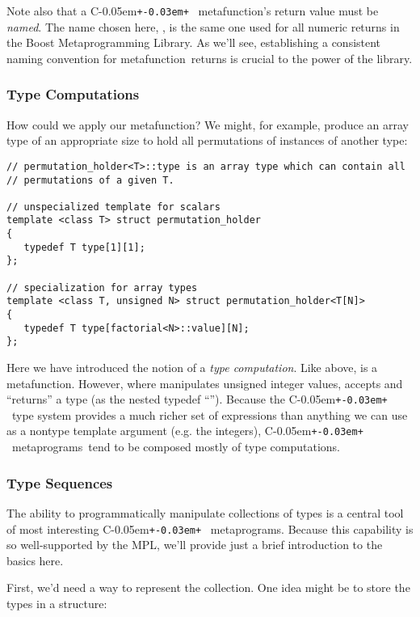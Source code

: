\documentclass{kapproc}
\newcommand{\Cpp}{C\kern-0.05em\texttt{+\kern-0.03em+}%
}
\newcommand{\Mpl}{Boost Meta\-pro\-gram\-ming Library}
\newcommand{\mpgms}{meta\-pro\-grams}
\newcommand{\mfn}{meta\-func\-tion}
\begin{document}
Note also that a \Cpp\ \mfn's return value must be \emph{named}. The
name chosen here, , is the same one used for all numeric
returns in the \Mpl. As we'll see, establishing a consistent naming
convention for \mfn\ returns is crucial to the power of the library.

\subsubsection{Type Computations}

How could we apply our  \mfn{}? We might, for example,
produce an array type of an appropriate size to hold all permutations
of instances of another type:

{\small
\begin{codesamp}\begin{verbatim}
// permutation_holder<T>::type is an array type which can contain all
// permutations of a given T.

// unspecialized template for scalars
template <class T> struct permutation_holder
{
   typedef T type[1][1];
};

// specialization for array types
template <class T, unsigned N> struct permutation_holder<T[N]>
{
   typedef T type[factorial<N>::value][N];
};
\end{verbatim}
\end{codesamp}
}

Here we have introduced the notion of a \emph{type computation}.  Like
 above,  is a
\mfn{}. However, where  manipulates unsigned integer
values,  accepts and ``returns'' a
type (as the nested typedef ``''). Because the \Cpp\ type
system provides a much richer set of expressions than anything we can
use as a nontype template argument (e.g. the integers), \Cpp\ \mpgms\
tend to be composed mostly of type computations.

\subsubsection{Type Sequences}

The ability to programmatically manipulate collections of types is a
central tool of most interesting \Cpp\ metaprograms. Because this
capability is so well-supported by the MPL, we'll provide just a brief
introduction to the basics here.

First, we'd need a way to represent the collection. One
idea might be to store the types in a structure:
\end{document}
